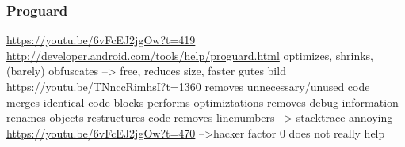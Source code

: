 \subsubsection{Proguard}\label{subsection:software-Proguard}
\url{https://youtu.be/6vFcEJ2jgOw?t=419}\newline
\url{http://developer.android.com/tools/help/proguard.html}\newline
optimizes, shrinks, (barely) obfuscates --> free, reduces size, faster\newline
gutes bild \url{https://youtu.be/TNnccRimhsI?t=1360}\newline
removes unnecessary/unused code\newline
merges identical code blocks\newline
performs optimiztations\newline
removes debug information\newline
renames objects\newline
restructures code\newline
removes linenumbers --> stacktrace annoying\newline
\url{https://youtu.be/6vFcEJ2jgOw?t=470}\newline
-->hacker factor 0\newline
does not really help
